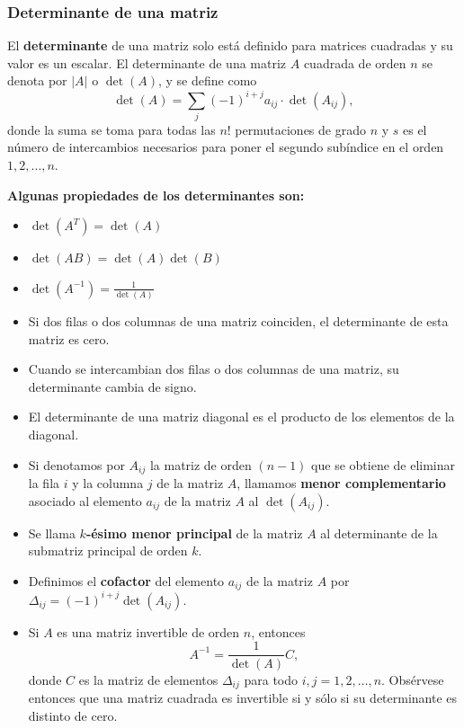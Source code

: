 \documentclass[12pt]{article}
\begin{document}
\subsubsection{Determinante de una matriz}

El \textbf{determinante} de una matriz solo está definido para matrices cuadradas y su valor es un escalar.  El determinante de una matriz $ A $ cuadrada de orden $ n $ se denota por $ |A| $ o $ \det(A) $, y se define como
$$\det(A) = \sum_{j} (-1)^{i+j} a_{ij} \cdot \det(A_{ij}),$$
donde la suma se toma para todas las $ n! $ permutaciones de grado $n$ y $s$ es el número de intercambios necesarios para poner el segundo subíndice en el orden $1, 2, \ldots, n$.

\textbf{Algunas propiedades de los determinantes son:}
\begin{itemize}
\item $\det(A^T) = \det(A)$
\item $\det(AB) = \det(A)\det(B)$
\item $\det(A^{-1}) = \frac{1}{\det(A)}$
\item Si dos filas o dos columnas de una matriz coinciden, el determinante de esta matriz es cero.
\item Cuando se intercambian dos filas o dos columnas de una matriz, su determinante cambia de signo.
\item El determinante de una matriz diagonal es el producto de los elementos de la diagonal.
\item Si denotamos por $A_{ij}$ la matriz de orden $ (n-1) $ que se obtiene de eliminar la fila $i$ y la columna $j$ de la matriz $A$, llamamos \textbf{menor complementario} asociado al elemento $a_{ij}$ de la matriz $A$ al $\det(A_{ij})$.

\item Se llama \textbf{$k$-ésimo menor principal} de la matriz $A$ al determinante de la submatriz principal de orden $k$.

\item Definimos el \textbf{cofactor} del elemento $a_{ij}$ de la matriz $A$ por $\Delta_{ij} = (-1)^{i+j} \det(A_{ij})$.

\item Si $A$ es una matriz invertible de orden $ n $, entonces $$A^{-1} = \frac{1}{\det(A)} C,$$ donde $ C $ es la matriz de elementos $\Delta_{ij}$ para todo $i,j = 1,2,\ldots,n$. Obsérvese entonces que una matriz cuadrada es invertible si y s\'olo si su determinante es distinto de cero.
\end{itemize}
\end{document}
